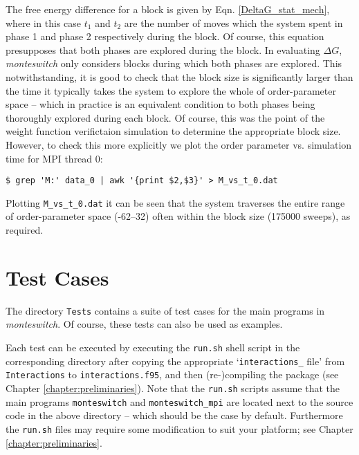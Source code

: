 \documentclass{report}
\begin{document}
The free energy difference for a block is given by Eqn. \eqref{DeltaG_stat_mech}, where in this case $t_1$ and $t_2$ are the number of moves which the 
system spent in phase 1 and phase 2 respectively during the block. Of course, this equation presupposes that both phases are explored during the block. 
In evaluating $\Delta G$, \emph{monteswitch} only considers blocks during which both phases are explored. This notwithstanding, it is good to check that
the block size is significantly larger than the time it typically takes the system to explore the whole of order-parameter space -- which in practice
is an equivalent condition to both phases being thoroughly explored during each block. Of course, this was the point of the weight function verifictaion
simulation to determine the appropriate block size. However, to check this more explicitly we plot the order parameter vs. simulation time for MPI thread 0:
\begin{verbatim}
$ grep 'M:' data_0 | awk '{print $2,$3}' > M_vs_t_0.dat
\end{verbatim}
Plotting \texttt{M\_vs\_t\_0.dat} it can be seen that the system traverses the entire range of order-parameter space (-62--32) often within the block size 
(175000 sweeps), as required.




\chapter{Test Cases}\label{chapter:tests}
The directory \texttt{Tests} contains a suite of test cases for the main programs in \emph{monteswitch}. Of course, these tests can also be used as
examples.

Each test can be executed by executing the \texttt{run.sh} shell script in the corresponding directory after copying the
appropriate `\texttt{interactions\_} file' from \texttt{Interactions} to \texttt{interactions.f95}, and then (re-)compiling the
package (see Chapter \ref{chapter:preliminaries}). Note that the \texttt{run.sh} scripts assume that the main programs \texttt{monteswitch}
and \texttt{monteswitch\_mpi} are located next to the source code in the above directory -- which should be the case by default. Furthermore
the \texttt{run.sh} files may require some modification to suit your platform; see Chapter \ref{chapter:preliminaries}.
\end{document}
